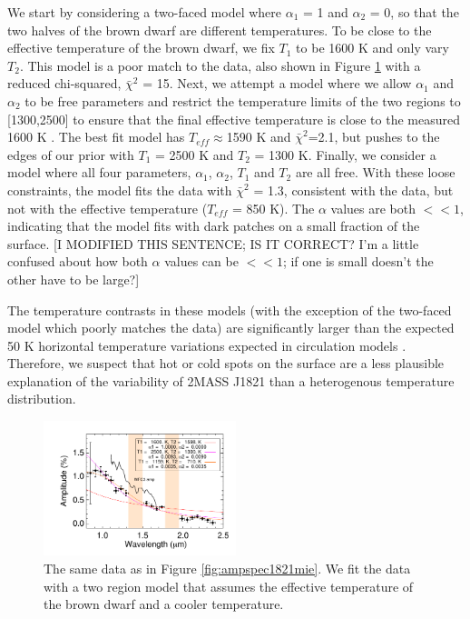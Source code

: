\documentclass[twocolumn]{aastex6}
\begin{document}
We start by considering a two-faced model where $\alpha_1$ = 1 and $\alpha_2$ = 0, so that the two halves of the brown dwarf are different temperatures.
To be close to the effective temperature of the brown dwarf, we fix $T_1$ to be 1600 K and only vary $T_2$.
This model is a poor match to the data, also shown in Figure \ref{fig:ampspec1821tdiff} with a reduced chi-squared, $\bar{\chi}^2$ = 15.
Next, we attempt a model where we allow $\alpha_1$ and $\alpha_2$ to be free parameters and restrict the temperature limits of the two regions to [1300,2500] to ensure that the final effective temperature is close to the measured 1600 K \citep{gagne2015banyan7}.
The best fit model has $T_{eff} \approx $1590 K and $\bar{\chi}^2$=2.1, but pushes to the edges of our prior with $T_1$ = 2500 K and $T_2$ = 1300 K.
Finally, we consider a model where all four parameters, $\alpha_1$, $\alpha_2$, $T_1$ and $T_2$ are all free.
With these loose constraints, the model fits the data with $\bar{\chi}^2$ = 1.3, consistent with the data, but not with the effective temperature ($T_{eff}$ = 850 K).
The $\alpha$ values are both $<<1$, indicating that the model fits with dark patches on a small fraction of the surface. [I MODIFIED THIS SENTENCE; IS IT CORRECT? I'm a little confused about how both $\alpha$ values can be $<<1$; if one is small doesn't the other have to be large?]

The temperature contrasts in these models (with the exception of the two-faced model which poorly matches the data) are significantly larger than the expected 50 K horizontal temperature variations expected in circulation models \citep{showman2013bdgpDynamics}.
Therefore, we suspect that hot or cold spots on the surface are a less plausible explanation of the variability of 2MASS J1821 than a heterogenous temperature distribution.

\begin{figure}
\begin{centering}
\includegraphics[width=0.5\textwidth]{amp_vs_wavl_j1821_t_diff.pdf}
\caption{The same data as in Figure \ref{fig:ampspec1821mie}. We fit the data with a two region model that assumes the effective temperature of the brown dwarf and a cooler temperature.}\label{fig:ampspec1821tdiff}
\end{centering}
\end{figure}
\end{document}

